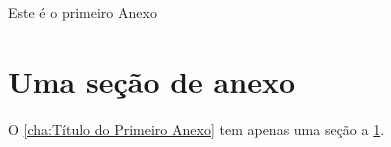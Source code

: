Este é o primeiro Anexo
\section{Uma seção de anexo} %
\label{sec:Uma seção de anexo}
O \ref{cha:Título do Primeiro Anexo} tem apenas uma seção a \ref{sec:Uma seção de anexo}.
